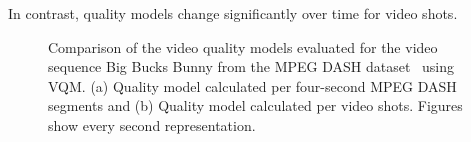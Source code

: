 In contrast, quality models change significantly over time for video shots.
\begin{figure}[!htb]
	\centering                 
	\caption[Video quality models generated for video shots and segments]{Comparison of the video quality models evaluated for the video sequence Big Bucks Bunny from the MPEG DASH dataset~\protect\cite{Lederer2012a} using \ac{VQM}. (a) Quality model calculated per four-second \ac{MPEG} DASH segments and (b) Quality model calculated per video shots. Figures show every second representation.}
	\label{fig:730_QualityVariationSegmentVsShot}
\end{figure}
